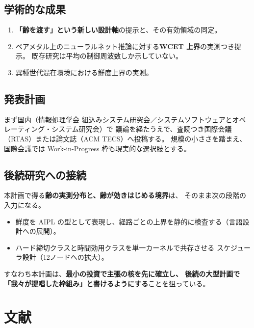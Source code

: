 \documentclass[11pt,a4paper]{article}
\newcommand{\keyp}[1]{\textbf{\textcolor{blue!45!black}{#1}}}
\begin{document}
\subsection{学術的な成果}

\begin{enumerate}[leftmargin=1.6em,itemsep=2pt]
  \item \keyp{「齢を渡す」という新しい設計軸}の提示と、その有効領域の同定。
  \item ベアメタル上のニューラルネット推論に対する\keyp{WCET 上界}の実測つき提示。
        既存研究は平均の制御周波数しか示していない。
  \item 異種世代混在環境における鮮度上界の実測。
\end{enumerate}

\subsection{発表計画}

まず国内（情報処理学会 組込みシステム研究会／システムソフトウェアとオペレーティング・システム研究会）で
議論を経たうえで、査読つき国際会議（RTAS）または論文誌（ACM TECS）へ投稿する。
規模の小ささを踏まえ、国際会議では Work-in-Progress 枠も現実的な選択肢とする。

\subsection{後続研究への接続}

本計画で得る\keyp{齢の実測分布と、齢が効きはじめる境界}は、
そのまま次の段階の入力になる。

\begin{itemize}[leftmargin=1.4em,itemsep=2pt]
  \item 鮮度を AIPL の型として表現し、経路ごとの上界を静的に検査する（言語設計への展開）。
  \item ハード締切クラスと時間効用クラスを単一カーネルで共存させる
        スケジューラ設計（12ノードへの拡大）。
\end{itemize}

\noindent
すなわち本計画は、\keyp{最小の投資で主張の核を先に確立し、
後続の大型計画で「我々が提唱した枠組み」と書けるようにする}ことを狙っている。

\section*{文献}
\end{document}
